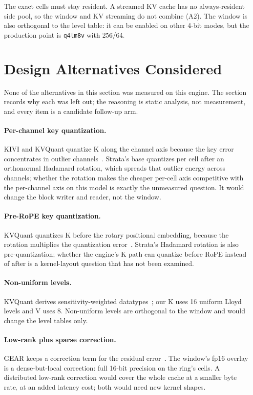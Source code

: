\documentclass[10pt,twocolumn]{article}
\begin{document}
The exact cells must stay resident. A streamed KV cache has no always-resident side pool, so the window and KV streaming do not combine (A2). The window is also orthogonal to the level table: it can be enabled on other 4-bit modes, but the production point is \texttt{q4lm8v} with 256/64.

\section{Design Alternatives Considered}\label{sec:alternatives}

None of the alternatives in this section was measured on this engine. The section records why each was left out; the reasoning is static analysis, not measurement, and every item is a candidate follow-up arm.

\paragraph{Per-channel key quantization.} KIVI and KVQuant quantize K along the channel axis because the key error concentrates in outlier channels~\cite{kivi,kvquant}. Strata's base quantizes per cell after an orthonormal Hadamard rotation, which spreads that outlier energy across channels; whether the rotation makes the cheaper per-cell axis competitive with the per-channel axis on this model is exactly the unmeasured question. It would change the block writer and reader, not the window.

\paragraph{Pre-RoPE key quantization.} KVQuant quantizes K before the rotary positional embedding, because the rotation multiplies the quantization error~\cite{kvquant}. Strata's Hadamard rotation is also pre-quantization; whether the engine's K path can quantize before RoPE instead of after is a kernel-layout question that has not been examined.

\paragraph{Non-uniform levels.} KVQuant derives sensitivity-weighted datatypes~\cite{kvquant}; our K uses 16 uniform Lloyd levels and V uses 8. Non-uniform levels are orthogonal to the window and would change the level tables only.

\paragraph{Low-rank plus sparse correction.} GEAR keeps a correction term for the residual error~\cite{gear}. The window's fp16 overlay is a dense-but-local correction: full 16-bit precision on the ring's cells. A distributed low-rank correction would cover the whole cache at a smaller byte rate, at an added latency cost; both would need new kernel shapes.
\end{document}
